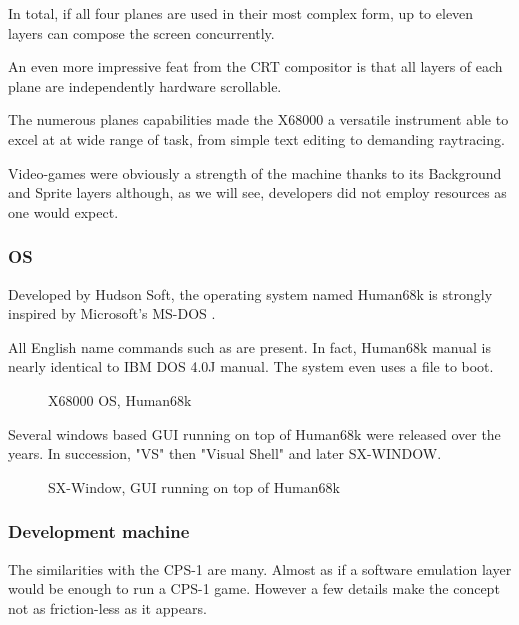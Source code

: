 In total, if all four planes are used in their most complex form, up to eleven layers can compose the screen concurrently. 

An even more impressive feat from the CRT compositor is that all layers of each plane are independently hardware scrollable.

The numerous planes capabilities made the X68000 a versatile instrument able to excel at at wide range of task, from simple text editing to demanding raytracing. 

Video-games were obviously a strength of the machine thanks to its Background and Sprite layers although, as we will see, developers did not employ resources as one would expect.








\subsubsection{OS}
Developed by Hudson Soft, the operating system named Human68k is strongly inspired by Microsoft's MS-DOS . 

All English name commands such as  are present. In fact, Human68k manual is nearly identical to IBM DOS 4.0J manual\cite{human68k_manual}. The system even uses a  file to boot.

\begin{figure}[H]
\caption*{X68000 OS, Human68k}
\end{figure}


Several windows based GUI running on top of Human68k were released over the years. In succession, "VS" then "Visual Shell" and later SX-WINDOW.

\begin{figure}[H]
\caption*{SX-Window, GUI running on top of Human68k}
\end{figure}



\subsubsection{Development machine}
The similarities with the CPS-1 are many. Almost as if a software emulation layer would be enough to run a CPS-1 game. However a few details make the concept not as friction-less as it appears.

